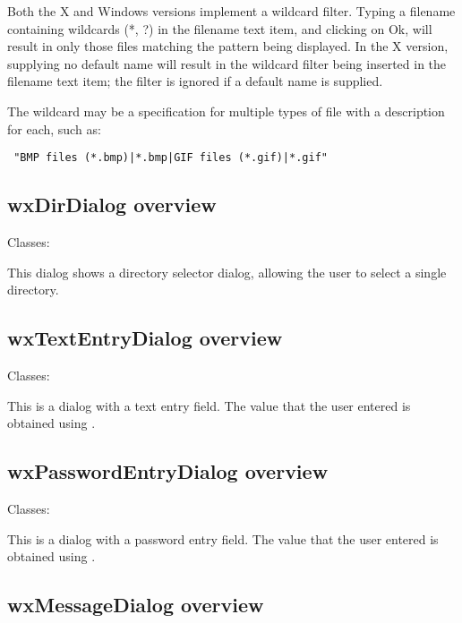 Both the X and Windows versions implement a wildcard filter. Typing a
filename containing wildcards (*, ?) in the filename text item, and
clicking on Ok, will result in only those files matching the pattern being
displayed. In the X version, supplying no default name will result in the
wildcard filter being inserted in the filename text item; the filter is
ignored if a default name is supplied.

The wildcard may be a specification for multiple
types of file with a description for each, such as:

\begin{verbatim}
 "BMP files (*.bmp)|*.bmp|GIF files (*.gif)|*.gif"
\end{verbatim}

\subsection{wxDirDialog overview}\label{wxdirdialogoverview}

Classes: 

This dialog shows a directory selector dialog, allowing the user to select a single
directory.

\subsection{wxTextEntryDialog overview}\label{wxtextentrydialogoverview}

Classes: 

This is a dialog with a text entry field. The value that the user
entered is obtained using .

\subsection{wxPasswordEntryDialog overview}\label{wxpasswordentrydialogoverview}

Classes: 

This is a dialog with a password entry field. The value that the user
entered is obtained using .

\subsection{wxMessageDialog overview}\label{wxmessagedialogoverview}

